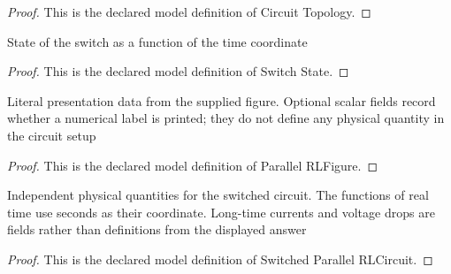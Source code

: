 \begin{proof}
  This is the declared model definition of Circuit Topology.
\end{proof}
\begin{definition}
  \label{def:physics:phyx-mini-0881:phyxminiproblems-problemphyxmini0881-switchstate}
  State of the switch as a function of the time coordinate
\end{definition}
\begin{proof}
  This is the declared model definition of Switch State.
\end{proof}
\begin{definition}
  \label{def:physics:phyx-mini-0881:phyxminiproblems-problemphyxmini0881-parallelrlfigure}
  Literal presentation data from the supplied figure. Optional scalar fields record whether a numerical label is printed; they do not define any physical quantity in the circuit setup
\end{definition}
\begin{proof}
  This is the declared model definition of Parallel RLFigure.
\end{proof}
\begin{definition}
  \label{def:physics:phyx-mini-0881:phyxminiproblems-problemphyxmini0881-switchedparallelrlcircuit}
  Independent physical quantities for the switched circuit. The functions of real time use seconds as their coordinate. Long-time currents and voltage drops are fields rather than definitions from the displayed answer
\end{definition}
\begin{proof}
  This is the declared model definition of Switched Parallel RLCircuit.
\end{proof}
